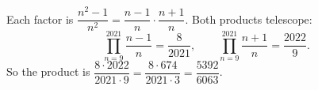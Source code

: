 Each factor is $\dfrac{n^2-1}{n^2}=\dfrac{n-1}{n}\cdot\dfrac{n+1}{n}$. Both products telescope:
\[\prod_{n=9}^{2021}\dfrac{n-1}{n}=\dfrac{8}{2021},\qquad\prod_{n=9}^{2021}\dfrac{n+1}{n}=\dfrac{2022}{9}.\]
So the product is $\dfrac{8\cdot2022}{2021\cdot9}=\dfrac{8\cdot674}{2021\cdot3}=\boxed{\dfrac{5392}{6063}}$.
